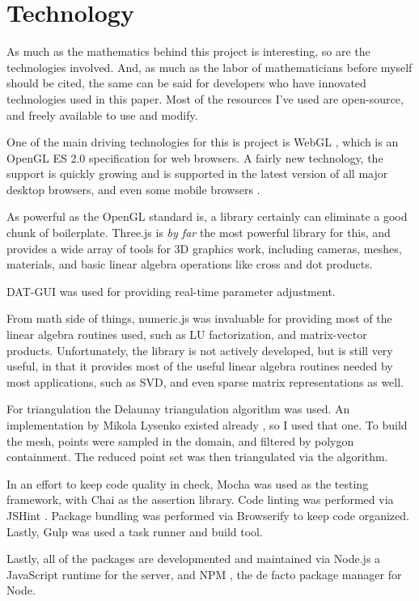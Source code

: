 \section{Technology}

As much as the mathematics behind this project is interesting, so are the technologies involved. And, as much as the
labor of mathematicians before myself should be cited, the same can be said for developers who have innovated
technologies used in this paper. Most of the resources I've used are open-source, and freely available to use and
modify.

One of the main driving technologies for this is project is WebGL \cite{webgl}, which is an OpenGL ES 2.0 specification
for web browsers. A fairly new technology, the support is quickly growing and is supported in the latest version of
all major desktop browsers, and even some mobile browsers \cite{caniuse_webgl}.

As powerful as the OpenGL standard is, a library certainly can eliminate a good chunk of boilerplate. Three.js
\cite{threejs} is \emph{by far} the most powerful library for this, and provides a wide array of tools for 3D
graphics work, including cameras, meshes, materials, and basic linear algebra operations like cross and dot products.

DAT-GUI \cite{datgui} was used for providing real-time parameter adjustment.

From math side of things, numeric.js \cite{numericjs} was invaluable for providing most of the linear algebra routines
used, such as LU factorization, and matrix-vector products. Unfortunately, the library is not actively developed, but is
still very useful, in that it provides most of the useful linear algebra routines needed by most applications, such as
SVD, and even sparse matrix representations as well.

For triangulation the Delaunay triangulation algorithm \cite{triangulation} was used. An implementation by Mikola
Lysenko existed already \cite{delaunay}, so I used that one. To build the mesh, points were sampled in the domain,
and filtered by polygon containment. The reduced point set was then triangulated via the algorithm.

In an effort to keep code quality in check, Mocha \cite{mocha} was used as the testing framework, with Chai
\cite{chai} as the assertion library. Code linting was performed via JSHint \cite{jshint}. Package bundling was
performed via Browserify \cite{browserify} to keep code organized. Lastly, Gulp \cite{gulp} was used a task runner
and build tool.

Lastly, all of the packages are developmented and maintained via Node.js \cite{node} a JavaScript runtime for the server,
and NPM \cite{npm}, the de facto package manager for Node.
